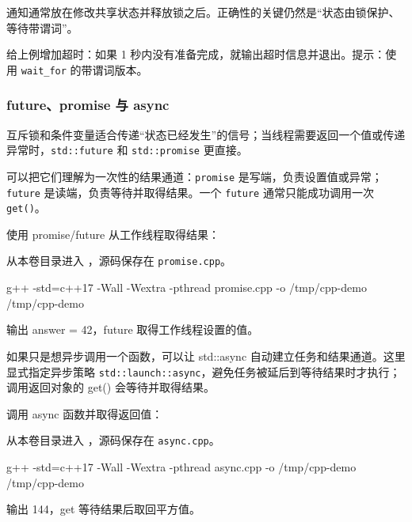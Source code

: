 通知通常放在修改共享状态并释放锁之后。正确性的关键仍然是“状态由锁保护、等待带谓词”。

\begin{exercise}\label{ex:v1-cpp-condition}

给上例增加超时：如果 1 秒内没有准备完成，就输出超时信息并退出。提示：使用 \texttt{wait\_for} 的带谓词版本。
\end{exercise}

\subsubsection{future、promise 与 async}
互斥锁和条件变量适合传递“状态已经发生”的信号；当线程需要返回一个值或传递异常时，\texttt{std::future} 和 \texttt{std::promise} 更直接。

可以把它们理解为一次性的结果通道：\texttt{promise} 是写端，负责设置值或异常；\texttt{future} 是读端，负责等待并取得结果。一个 \texttt{future} 通常只能成功调用一次 \texttt{get()}。

\begin{example}
使用 promise/future 从工作线程取得结果：



从本卷目录进入 ，源码保存在 \texttt{promise.cpp}。
\begin{tbash}
g++ -std=c++17 -Wall -Wextra -pthread promise.cpp -o /tmp/cpp-demo
/tmp/cpp-demo
\end{tbash}
输出 answer = 42，future 取得工作线程设置的值。
\end{example}

如果只是想异步调用一个函数，可以让 std::async 自动建立任务和结果通道。这里显式指定异步策略 \texttt{std::launch::async}，避免任务被延后到等待结果时才执行；调用返回对象的 get() 会等待并取得结果。

\begin{example}
调用 async 函数并取得返回值：



从本卷目录进入 ，源码保存在 \texttt{async.cpp}。
\begin{tbash}
g++ -std=c++17 -Wall -Wextra -pthread async.cpp -o /tmp/cpp-demo
/tmp/cpp-demo
\end{tbash}
输出 144，get 等待结果后取回平方值。
\end{example}

